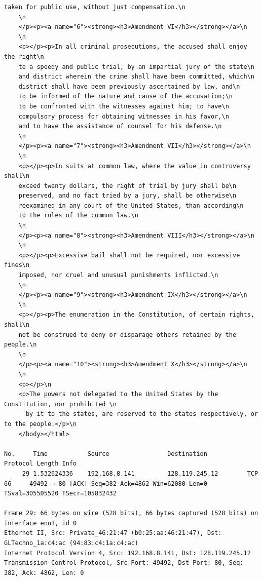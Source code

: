 \documentclass[a4paper,11pt,final]{report}
\begin{document}
\begin{lstlisting}[breaklines]
    taken for public use, without just compensation.\n
    \n
    </p><p><a name="6"><strong><h3>Amendment VI</h3></strong></a>\n
    \n
    <p></p><p>In all criminal prosecutions, the accused shall enjoy the right\n
    to a speedy and public trial, by an impartial jury of the state\n
    and district wherein the crime shall have been committed, which\n
    district shall have been previously ascertained by law, and\n
    to be informed of the nature and cause of the accusation;\n
    to be confronted with the witnesses against him; to have\n
    compulsory process for obtaining witnesses in his favor,\n
    and to have the assistance of counsel for his defense.\n
    \n
    </p><p><a name="7"><strong><h3>Amendment VII</h3></strong></a>\n
    \n
    <p></p><p>In suits at common law, where the value in controversy shall\n
    exceed twenty dollars, the right of trial by jury shall be\n
    preserved, and no fact tried by a jury, shall be otherwise\n
    reexamined in any court of the United States, than according\n
    to the rules of the common law.\n
    \n
    </p><p><a name="8"><strong><h3>Amendment VIII</h3></strong></a>\n
    \n
    <p></p><p>Excessive bail shall not be required, nor excessive fines\n
    imposed, nor cruel and unusual punishments inflicted.\n
    \n
    </p><p><a name="9"><strong><h3>Amendment IX</h3></strong></a>\n
    \n
    <p></p><p>The enumeration in the Constitution, of certain rights, shall\n
    not be construed to deny or disparage others retained by the people.\n
    \n
    </p><p><a name="10"><strong><h3>Amendment X</h3></strong></a>\n
    \n
    <p></p>\n
    <p>The powers not delegated to the United States by the Constitution, nor prohibited \n
      by it to the states, are reserved to the states respectively, or to the people.</p>\n
    </body></html>

No.     Time           Source                Destination           Protocol Length Info
     29 1.532624336    192.168.8.141         128.119.245.12        TCP      66     49492 → 80 [ACK] Seq=382 Ack=4862 Win=62080 Len=0 TSval=305505520 TSecr=105832432

Frame 29: 66 bytes on wire (528 bits), 66 bytes captured (528 bits) on interface eno1, id 0
Ethernet II, Src: Private_46:21:47 (b0:25:aa:46:21:47), Dst: GLTechno_1a:c4:ac (94:83:c4:1a:c4:ac)
Internet Protocol Version 4, Src: 192.168.8.141, Dst: 128.119.245.12
Transmission Control Protocol, Src Port: 49492, Dst Port: 80, Seq: 382, Ack: 4862, Len: 0
\end{lstlisting}
\end{document}
